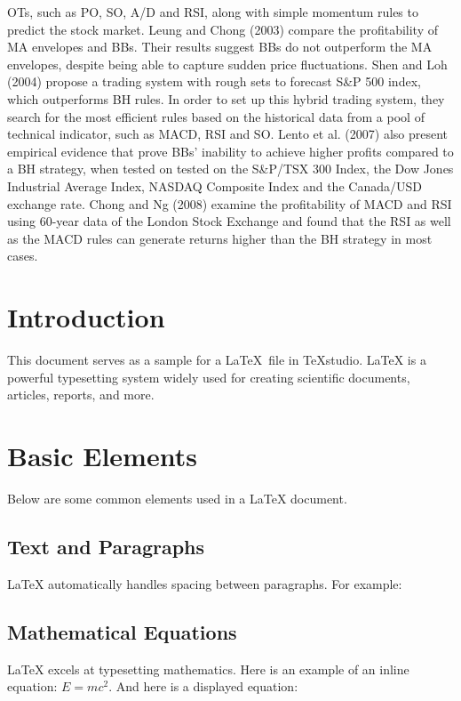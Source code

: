 \documentclass[12pt]{article}
\begin{document}
	OTs, such as PO, SO, A/D and RSI, along with simple momentum rules to predict the stock market.
	Leung and Chong (2003) compare the profitability of MA envelopes and BBs. Their results suggest
	BBs do not outperform the MA envelopes, despite being able to capture sudden price fluctuations.
	Shen and Loh (2004) propose a trading system with rough sets to forecast S&P 500 index, which
	outperforms BH rules. In order to set up this hybrid trading system, they search for the most
	efficient rules based on the historical data from a pool of technical indicator, such as MACD, RSI
	and SO. Lento et al. (2007) also present empirical evidence that prove BBs’ inability to achieve
	higher profits compared to a BH strategy, when tested on tested on the S&P/TSX 300 Index, the
	Dow Jones Industrial Average Index, NASDAQ Composite Index and the Canada/USD exchange
	rate. Chong and Ng (2008) examine the profitability of MACD and RSI using 60-year data of the
	London Stock Exchange and found that the RSI as well as the MACD rules can generate returns
	higher than the BH strategy in most cases.


	
	\section{Introduction}
	This document serves as a sample for a \LaTeX\ file in TeXstudio. LaTeX is a powerful typesetting system widely used for creating scientific documents, articles, reports, and more.
	
	\section{Basic Elements}
	Below are some common elements used in a LaTeX document.
	
	\subsection{Text and Paragraphs}
	LaTeX automatically handles spacing between paragraphs. For example:
	
	\lipsum[1] %
	
	\subsection{Mathematical Equations}
	LaTeX excels at typesetting mathematics. Here is an example of an inline equation: \( E = mc^2 \). And here is a displayed equation:
	
\end{document}
